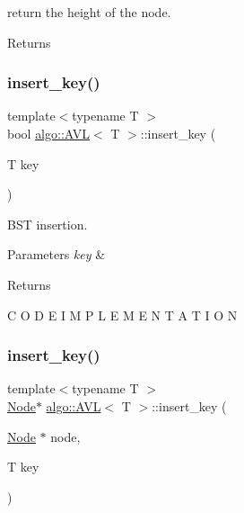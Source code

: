 return the height of the node. \begin{DoxyReturn}{Returns}

\end{DoxyReturn}
\mbox{\label{classalgo_1_1_a_v_l_afc04af90c22d3c65b904efe58ba9cebd}} 
\subsubsection{\texorpdfstring{insert\+\_\+key()}{insert\_key()}\hspace{0.1cm}{\footnotesize\ttfamily [1/2]}}
{\footnotesize\ttfamily template$<$typename T $>$ \\
bool \hyperlink{classalgo_1_1_a_v_l}{algo\+::\+A\+VL}$<$ T $>$\+::insert\+\_\+key (\begin{DoxyParamCaption}\item[{T}]{key }\end{DoxyParamCaption})}

B\+ST insertion. 
\begin{DoxyParams}{Parameters}
{\em key} & \\
\hline
\end{DoxyParams}
\begin{DoxyReturn}{Returns}

\end{DoxyReturn}
C O D E I M P L E M E N T A T I O N \mbox{\label{classalgo_1_1_a_v_l_adbd766a0c0e4904a6ce2fbc576dfe5d3}} 
\subsubsection{\texorpdfstring{insert\+\_\+key()}{insert\_key()}\hspace{0.1cm}{\footnotesize\ttfamily [2/2]}}
{\footnotesize\ttfamily template$<$typename T $>$ \\
\hyperlink{structalgo_1_1_a_v_l_1_1_node}{Node}$\ast$ \hyperlink{classalgo_1_1_a_v_l}{algo\+::\+A\+VL}$<$ T $>$\+::insert\+\_\+key (\begin{DoxyParamCaption}\item[{\hyperlink{structalgo_1_1_a_v_l_1_1_node}{Node} $\ast$}]{node,  }\item[{T}]{key }\end{DoxyParamCaption})}

